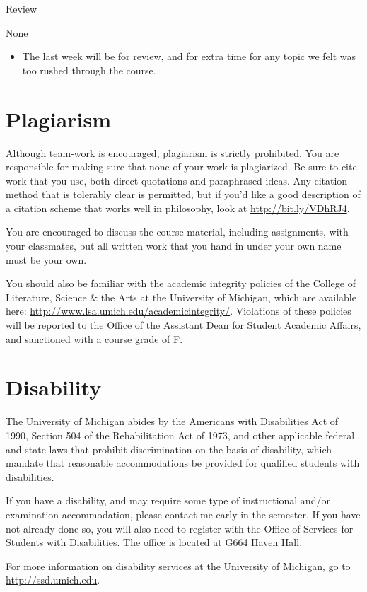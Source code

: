 \documentclass[
]{article}
\providecommand{\tightlist}{%
  \setlength{\itemsep}{0pt}\setlength{\parskip}{0pt}}\usepackage{longtable,booktabs,array}
\begin{document}
\begin{description}
\tightlist
\item[Topic]
Review
\item[Required Reading]
None
\end{description}

\begin{itemize}
\tightlist
\item
  The last week will be for review, and for extra time for any topic we
  felt was too rushed through the course.
\end{itemize}

\hypertarget{plagiarism}{%
\section{Plagiarism}\label{plagiarism}}

Although team-work is encouraged, plagiarism is strictly prohibited. You
are responsible for making sure that none of your work is plagiarized.
Be sure to cite work that you use, both direct quotations and
paraphrased ideas. Any citation method that is tolerably clear is
permitted, but if you'd like a good description of a citation scheme
that works well in philosophy, look at \url{http://bit.ly/VDhRJ4}.

You are encouraged to discuss the course material, including
assignments, with your classmates, but all written work that you hand in
under your own name must be your own.

You should also be familiar with the academic integrity policies of the
College of Literature, Science \& the Arts at the University of
Michigan, which are available here:
\url{http://www.lsa.umich.edu/academicintegrity/}. Violations of these
policies will be reported to the Office of the Assistant Dean for
Student Academic Affairs, and sanctioned with a course grade of F.

\hypertarget{disability}{%
\section{Disability}\label{disability}}

The University of Michigan abides by the Americans with Disabilities Act
of 1990, Section 504 of the Rehabilitation Act of 1973, and other
applicable federal and state laws that prohibit discrimination on the
basis of disability, which mandate that reasonable accommodations be
provided for qualified students with disabilities.

If you have a disability, and may require some type of instructional
and/or examination accommodation, please contact me early in the
semester. If you have not already done so, you will also need to
register with the Office of Services for Students with Disabilities. The
office is located at G664 Haven Hall.

For more information on disability services at the University of
Michigan, go to \url{http://ssd.umich.edu}.
\end{document}
